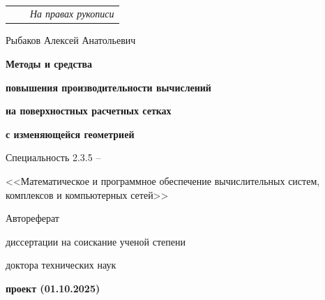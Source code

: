 \documentclass[a4paper,14pt]{extarticle}                     %
\theoremstyle{plain}                                         %
\begin{document}

\thispagestyle{empty}

\

\vspace{0pt plus0.5fill} %

\noindent%
\begin{tabularx}{\textwidth}{@{}lXr@{}}%
    & & \textit{На правах рукописи}\\
\end{tabularx}

\vspace{0pt plus4fill} %
\begin{center}
Рыбаков Алексей Анатольевич
\end{center}

\vspace{0pt plus2fill} %
\begin{center}
\textbf{\large Методы и средства}

\textbf{\large повышения производительности вычислений}

\textbf{\large на поверхностных расчетных сетках}

\textbf{\large с изменяющейся геометрией}

\vspace{0pt plus2fill} %
{Специальность 2.3.5 --\par <<Математическое и программное обеспечение вычислительных систем, комплексов и компьютерных сетей>>}

\vspace{0pt plus1.5fill} %
Автореферат\par
диссертации на соискание ученой степени\par доктора технических наук\par
\textbf{проект (01.10.2025)}
\end{center}
\end{document}
